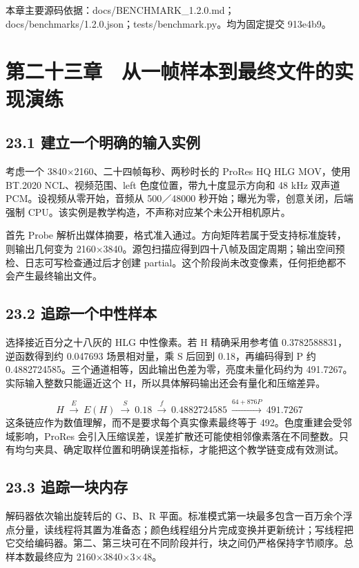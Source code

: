 \documentclass[UTF8,zihao=-4,openany]{ctexbook}
\begin{document}
\par\small 本章主要源码依据：docs/BENCHMARK\_1.2.0.md；docs/benchmarks/1.2.0.json；tests/benchmark.py。均为固定提交 913e4b9。\normalsize

\chapter*{第二十三章　从一帧样本到最终文件的实现演练}

\section*{23.1 建立一个明确的输入实例}
考虑一个 3840×2160、二十四帧每秒、两秒时长的 ProRes HQ HLG MOV，使用 BT.2020 NCL、视频范围、left 色度位置，带九十度显示方向和 48 kHz 双声道 PCM。设视频从零开始，音频从 500／48000 秒开始；曝光为零，创意关闭，后端强制 CPU。该实例是教学构造，不声称对应某个未公开相机原片。

首先 Probe 解析出媒体摘要，格式准入通过。方向矩阵若属于受支持标准旋转，则输出几何变为 2160×3840。源包扫描应得到四十八帧及固定周期；输出空间预检、日志可写检查通过后才创建 partial。这个阶段尚未改变像素，任何拒绝都不会产生最终输出文件。


\section*{23.2 追踪一个中性样本}
选择接近百分之十八灰的 HLG 中性像素。若 H 精确采用参考值 0.3782588831，逆函数得到约 0.047693 场景相对量，乘 S 后回到 0.18，再编码得到 P 约 0.4882724585。三个通道相等，因此输出色差为零，亮度未量化码约为 491.7267。实际输入整数只能逼近这个 H，所以具体解码输出还会有量化和压缩差异。


\begin{equation}
H\ \xrightarrow{E}\ E(H)\ \xrightarrow{S}\ 0.18\ \xrightarrow{f}\ 0.4882724585\ \xrightarrow{64+876P}\ 491.7267
\end{equation}
这条链应作为数值理解，而不是要求每个真实像素最终等于 492。色度重建会受邻域影响，ProRes 会引入压缩误差，误差扩散还可能使相邻像素落在不同整数。只有均匀夹具、确定取样位置和明确误差指标，才能把这个教学链变成有效测试。


\section*{23.3 追踪一块内存}
解码器依次输出旋转后的 G、B、R 平面。标准模式第一块最多包含一百万余个浮点分量，读线程将其置为准备态；颜色线程组分片完成变换并更新统计；写线程把它交给编码器。第二、第三块可在不同阶段并行，块之间仍严格保持字节顺序。总样本数最终应为 2160×3840×3×48。
\end{document}
